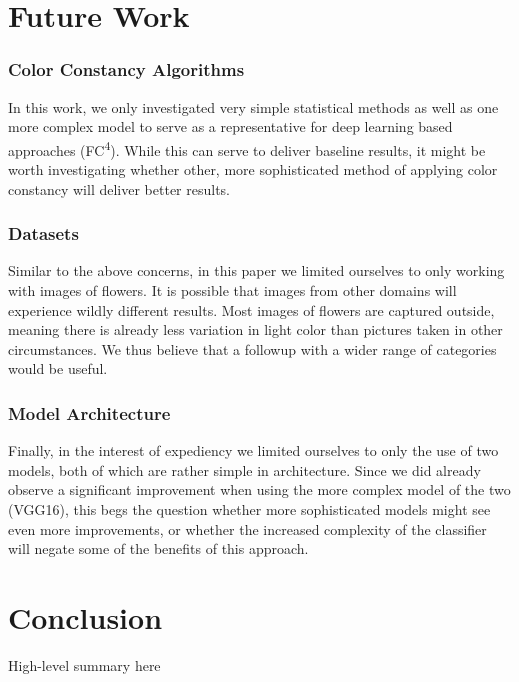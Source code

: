 \section{Future Work}

\subsubsection{Color Constancy Algorithms}

In this work, we only investigated very simple statistical methods as well as one more complex model to serve as a representative
for deep learning based approaches (FC\textsuperscript{4}). While this can serve to deliver baseline results, it might be worth investigating
whether other, more sophisticated method of applying color constancy will deliver better results.

\subsubsection{Datasets}

Similar to the above concerns, in this paper we limited ourselves to only working with images of flowers. It is possible that images from 
other domains will experience wildly different results. Most images of flowers are captured outside, meaning there is already less variation in
light color than pictures taken in other circumstances. We thus believe that a followup with a wider range of categories would be useful.

\subsubsection{Model Architecture}

Finally, in the interest of expediency we limited ourselves to only the use of two models, both of which are rather simple in architecture.
Since we did already observe a significant improvement when using the more complex model of the two (VGG16), this begs the question whether
more sophisticated models might see even more improvements, or whether the increased complexity of the classifier will negate some of the benefits
of this approach.

\section{Conclusion}

{\color{red}High-level summary here}
